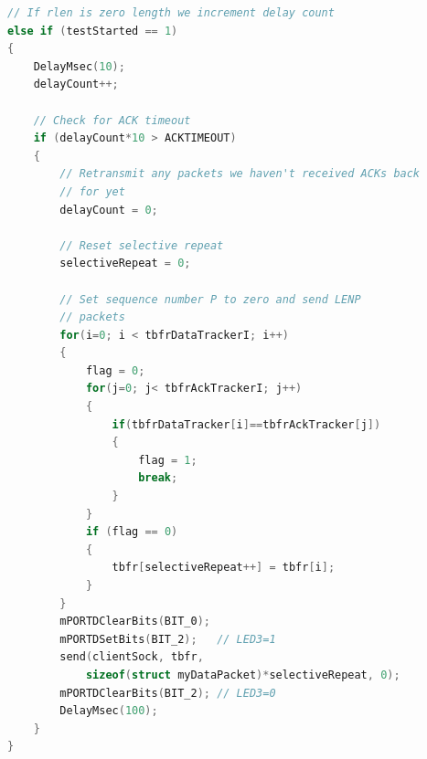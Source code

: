 \documentclass[12pt]{article}
\begin{document}
\begin{lstlisting}[language=c, 
caption=Sliding Window - ACK Timeout Handler,
label=lst:slideacktimeout]
// If rlen is zero length we increment delay count
else if (testStarted == 1)
{
    DelayMsec(10);
    delayCount++;
    
    // Check for ACK timeout
    if (delayCount*10 > ACKTIMEOUT)
    {
        // Retransmit any packets we haven't received ACKs back
        // for yet
        delayCount = 0;

        // Reset selective repeat
        selectiveRepeat = 0;

        // Set sequence number P to zero and send LENP 
        // packets
        for(i=0; i < tbfrDataTrackerI; i++)
        {
            flag = 0;
            for(j=0; j< tbfrAckTrackerI; j++)
            {
                if(tbfrDataTracker[i]==tbfrAckTracker[j])
                {
                    flag = 1;
                    break;
                }
            }
            if (flag == 0)
            {
                tbfr[selectiveRepeat++] = tbfr[i];
            }
        }
        mPORTDClearBits(BIT_0);
        mPORTDSetBits(BIT_2);   // LED3=1
        send(clientSock, tbfr, 
            sizeof(struct myDataPacket)*selectiveRepeat, 0);
        mPORTDClearBits(BIT_2); // LED3=0 
        DelayMsec(100);              
    }
}
\end{lstlisting}
\end{document}
